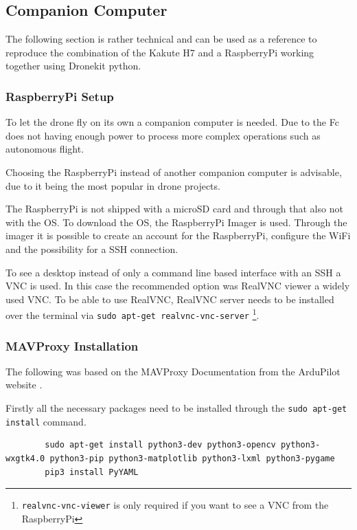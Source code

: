 \documentclass[svgnames]{article}
\begin{document}
	\subsection{Companion Computer}\label{companion computer}
	The following section is rather technical and can be used as a reference to reproduce the combination of the Kakute H7 and a RaspberryPi working together using Dronekit python.
	\subsubsection{RaspberryPi Setup}
	
	To let the drone fly on its own a companion computer is needed. Due to the \gls{Fc} does not having enough power to process more complex operations such as autonomous flight.
	
	Choosing the RaspberryPi instead of another companion computer is advisable, due to it being the most popular in drone projects.
	
	The RaspberryPi is not shipped with a microSD card and through that also not with the \gls{OS}. To download the \gls{OS}, the RaspberryPi Imager is used. Through the imager it is possible to create an account for the RaspberryPi,  configure the WiFi and the possibility for a \gls{SSH} connection. 

	
	To see a desktop instead of only a command line based interface with an \gls{SSH} a \gls{VNC} is used. In this case the recommended option was RealVNC viewer a widely used \gls{VNC}. To be able to use RealVNC, RealVNC server needs to be installed over the terminal via \lstinline|sudo apt-get realvnc-vnc-server| \cite{ionisvnctutorial}\footnote{\lstinline|realvnc-vnc-viewer| is only required if you want to see a VNC from the RaspberryPi}.
	
	\subsubsection{MAVProxy Installation}
	The following was based on the MAVProxy Documentation from the ArduPilot website  \cite{MavProxydocs}.
	
	Firstly all the necessary packages need to be installed through the \lstinline|sudo apt-get install| command. 
	\begin{lstlisting}
		sudo apt-get install python3-dev python3-opencv python3-wxgtk4.0 python3-pip python3-matplotlib python3-lxml python3-pygame
		pip3 install PyYAML
	\end{lstlisting}
\end{document}
